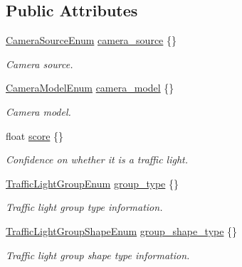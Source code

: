 \subsection*{Public Attributes}
\begin{DoxyCompactItemize}
\item 
\hyperlink{structmaf__perception__interface_1_1CameraSourceEnum}{Camera\+Source\+Enum} \hyperlink{structmaf__perception__interface_1_1PhysicalTrafficLightSingleFrame_ab368f2122af8f4146b7aecdbeadc1839}{camera\+\_\+source} \{\}
\begin{DoxyCompactList}\small\item\em Camera source. \end{DoxyCompactList}\item 
\hyperlink{structmaf__perception__interface_1_1CameraModelEnum}{Camera\+Model\+Enum} \hyperlink{structmaf__perception__interface_1_1PhysicalTrafficLightSingleFrame_ab80b97455a538e23b7fb6cc30dfa4654}{camera\+\_\+model} \{\}
\begin{DoxyCompactList}\small\item\em Camera model. \end{DoxyCompactList}\item 
float \hyperlink{structmaf__perception__interface_1_1PhysicalTrafficLightSingleFrame_a32b60e113cb99358abb8ed31cb5fc6a6}{score} \{\}
\begin{DoxyCompactList}\small\item\em Confidence on whether it is a traffic light. \end{DoxyCompactList}\item 
\hyperlink{structmaf__perception__interface_1_1TrafficLightGroupEnum}{Traffic\+Light\+Group\+Enum} \hyperlink{structmaf__perception__interface_1_1PhysicalTrafficLightSingleFrame_a522e572fcaf46ff05d7cededbd03e1e7}{group\+\_\+type} \{\}
\begin{DoxyCompactList}\small\item\em Traffic light group type information. \end{DoxyCompactList}\item 
\hyperlink{structmaf__perception__interface_1_1TrafficLightGroupShapeEnum}{Traffic\+Light\+Group\+Shape\+Enum} \hyperlink{structmaf__perception__interface_1_1PhysicalTrafficLightSingleFrame_a01943b51bc6c87faa7c7d98ea5c36b3b}{group\+\_\+shape\+\_\+type} \{\}
\begin{DoxyCompactList}\small\item\em Traffic light group shape type information. \end{DoxyCompactList}\item 

\end{DoxyCompactItemize}

